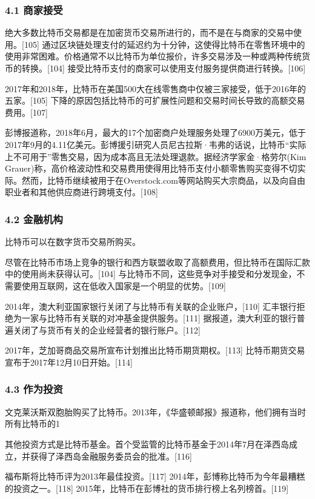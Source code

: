 \subsubsection{4.1 商家接受}
绝大多数比特币交易都是在加密货币交易所进行的，而不是在与商家的交易中使用。[105] 通过区块链处理支付的延迟约为十分钟，这使得比特币在零售环境中的使用非常困难。价格通常不以比特币为单位报价，许多交易涉及一种或两种传统货币的转换。[104] 接受比特币支付的商家可以使用支付服务提供商进行转换。[106]

2017年和2018年，比特币在美国500大在线零售商中仅被三家接受，低于2016年的五家。[105] 下降的原因包括比特币的可扩展性问题和交易时间长导致的高额交易费用。[107]

彭博报道称，2018年6月，最大的17个加密商户处理服务处理了6900万美元，低于2017年9月的4.11亿美元。彭博援引研究人员尼古拉斯·韦弗的话说，比特币“实际上不可用于”零售交易，因为成本高且无法处理退款。据经济学家金·格劳尔(Kim Grauer)称，高价格波动性和交易费用使得用比特币支付小额零售购买变得不切实际。然而，比特币继续被用于在Overstock.com等网站购买大宗商品，以及向自由职业者和其他供应商进行跨境支付。[108]
\subsubsection{4.2 金融机构}
比特币可以在数字货币交易所购买。

尽管在比特币市场上竞争的银行和西方联盟收取了高额费用，但比特币在国际汇款中的使用尚未获得认可。[104] 与比特币不同，这些竞争对手接受和分发现金，不需要使用互联网，这在低收入国家是一个明显的优势。[109]

2014年，澳大利亚国家银行关闭了与比特币有关联的企业账户，[110] 汇丰银行拒绝为一家与比特币有关联的对冲基金提供服务。[111] 据报道，澳大利亚的银行普遍关闭了与货币有关的企业经营者的银行账户。[112]

2017年，芝加哥商品交易所宣布计划推出比特币期货期权。[113] 比特币期货交易宣布于2017年12月10日开始。[114]
\subsubsection{4.3 作为投资}
文克莱沃斯双胞胎购买了比特币。2013年，《华盛顿邮报》报道称，他们拥有当时所有比特币的1%

其他投资方式是比特币基金。首个受监管的比特币基金于2014年7月在泽西岛成立，并获得了泽西岛金融服务委员会的批准。[116]

福布斯将比特币评为2013年最佳投资。[117] 2014年，彭博称比特币为今年最糟糕的投资之一。[118] 2015年，比特币在彭博社的货币排行榜上名列榜首。[119]

